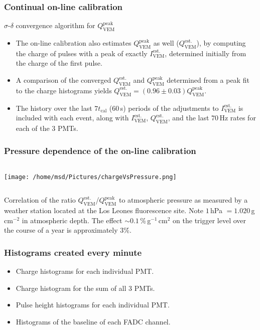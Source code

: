 \documentclass[aspectratio=169]{beamer}
\begin{document}
\begin{frame}
  \frametitle{Continual on-line calibration} 
  $\sigma$-$\delta$ convergence algorithm for $Q^{\mathrm{peak}}_{\mathrm{VEM}}$
  \begin{itemize}
    \item<2-> The on-line calibration also estimates
      $Q^{\mathrm{peak}}_{\mathrm{VEM}}$ as well
      ($Q^{\mathrm{est.}}_{\mathrm{VEM}}$), by computing the
      charge of pulses with a peak of exactly
      $I^{\mathrm{est.}}_{\mathrm{VEM}}$, determined initially
      from the charge of the first pulse.
    \item<3-> A comparison of the converged
      $Q^{\mathrm{est.}}_{\mathrm{VEM}}$ and
      $Q^{\mathrm{peak}}_{\mathrm{VEM}}$ determined from a peak
      fit to the charge histograms yields
      $Q^{\mathrm{est.}}_{\mathrm{VEM}}=(0.96\pm0.03)Q^{\mathrm{peak}}_{\mathrm{VEM}}$.
    \item<4-> The history over the last $7t_\mathrm{cal}$
      ($60$\,s) periods of the adjustments to
      $I^{\mathrm{est.}}_{\mathrm{VEM}}$ is included with each
      event, along with $I^{\mathrm{est.}}_{\mathrm{VEM}}$,
      $Q^{\mathrm{est.}}_{\mathrm{VEM}}$, and the last $70$\,Hz
      rates for each of the 3 PMTs.
  \end{itemize}
\end{frame}


\begin{frame}
  \frametitle{Pressure dependence of the on-line calibration}
  \begin{columns}
    \begin{column}{.6\textwidth}
      \texttt{[image: /home/msd/Pictures/chargeVsPressure.png]}
    \end{column}
  \end{columns}
  Correlation of the ratio
  $Q^{\mathrm{est.}}_{\mathrm{VEM}}$/$Q^{\mathrm{peak}}_{\mathrm{VEM}}$
  to atmospheric pressure as measured by a weather station
  located at the Los Leones fluorescence site. Note
  $1$\,hPa $ =1.020$\,g\,cm$^{-2}$ in atmospheric depth. The
  effect $\sim0.1$\,\%\,g$^{-1}$\,cm$^2$ on the trigger level
  over the  course of a year is approximately $3$\.\%.
\end{frame}

\begin{frame}
  \frametitle{Histograms created every minute}
  \begin{itemize}
    \item<1-> Charge histograms for each individual PMT.
    \item<2-> Charge histogram for the sum of all 3 PMTs.
    \item<3-> Pulse height histograms for each individual PMT.
    \item<4-> Histograms of the baseline of each FADC channel.
  \end{itemize}
\end{frame}
\end{document}
